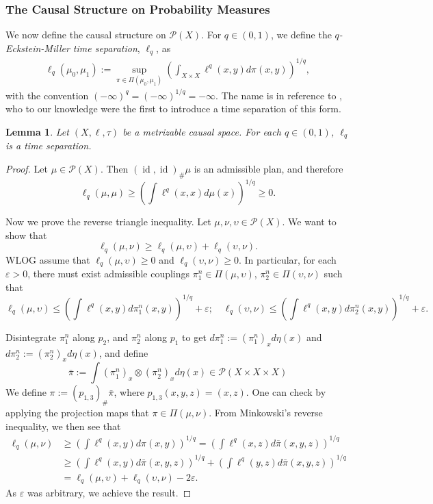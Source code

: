 \documentclass{article}
\renewcommand{\epsilon}{\varepsilon}
\newcommand{\Pcal}{\mathcal{P}}
\DeclareMathOperator{\id}{id}
\newtheorem{lemma}[theorem]{Lemma}
\theoremstyle{definition}
\begin{document}
{\subsubsection{The Causal Structure on Probability Measures}
We now define the causal structure on $\Pcal(X)$. For $q\in(0,1)$, we define the {\it $q$-Eckstein-Miller time separation}, $\ell_q$, as 
\begin{align}\label{l_qdefn}
\ell_q(\mu_0,\mu_1):= \sup_{\pi\in \Pi(\mu_0,\mu_1)} \left(\int_{X\times X} \ell^q(x,y)d\pi(x,y)\right)^{1/q},
\end{align}
with the convention $(-\infty)^q=(-\infty)^{1/q}= -\infty$. The name is in reference to \cite[Def.\ 3]{EcksteinMiller}, who to our knowledge were the first to introduce a time separation of this form. 
\begin{lemma}
Let $(X,\ell,\tau)$ be a metrizable causal space. For each $q\in (0, 1)$, $\ell_q$ is a time separation.
\end{lemma}
\begin{proof}
Let $\mu\in \Pcal(X)$. Then $(\id,\id)_\#\mu$ is an admissible plan, and therefore 
\[\ell_q(\mu,\mu)\geq \left(\int \ell^q(x,x)d\mu(x)\right)^{1/q}\geq 0.\]

Now we prove the reverse triangle inequality. Let $\mu, \nu, \upsilon\in \Pcal(X)$. We want to show that 
\[\ell_q(\mu,\nu)\geq \ell_q(\mu, \upsilon)+\ell_q(\upsilon, \nu). \]
WLOG assume that $\ell_q(\mu,\upsilon)\geq 0$ and $\ell_q(\upsilon, \nu)\geq 0$. In particular, for each $\epsilon>0$, there must exist admissible couplings $\pi_1^n\in \Pi(\mu,\upsilon)$, $\pi_2^n\in \Pi(\upsilon, \nu)$ such that 
\[\ell_q(\mu, \upsilon)\leq \left(\int \ell^q(x,y)d\pi_1^n(x,y)\right)^{1/q}+\epsilon; \quad \ell_q(\upsilon, \nu) \leq \left(\int\ell^q(x,y)d\pi_2^n(x,y)\right)^{1/q}+\epsilon.\]

Disintegrate $\pi_1^n$ along $p_2$, and $\pi_2^n$ along $p_1$ to get $d\pi_1^n:=  (\pi_1^n)_x d\eta(x)$ and $d\pi_2^n :=  (\pi_2^n)_x d\eta(x)$, and define 
\[\bar \pi:= \int (\pi_1^n)_x\otimes (\pi_2^n)_x d\eta(x) \in \Pcal(X\times X\times X)\]
We define $\pi:= (p_{1,3})_\# \bar \pi$, where $p_{1,3}(x,y,z)= (x,z)$. One can check by applying the projection maps that $\pi\in \Pi(\mu, \nu)$. From Minkowski's reverse inequality, we then see that 
\begin{align*}
\ell_q(\mu, \nu) &\geq \left(\int \ell^q(x,y) d\pi(x,y)\right)^{1/q} = \left(\int \ell^q(x,z) d\bar \pi(x,y,z)\right)^{1/q}\\
&\geq \left(\int \ell^q(x,y) d\bar \pi(x,y,z)\right)^{1/q}+\left(\int \ell^q(y,z)d\bar \pi(x,y,z)\right)^{1/q}\\
&= \ell_q(\mu, \upsilon)+\ell_q(\upsilon,\nu)-2\epsilon.
\end{align*}
As $\epsilon$ was arbitrary, we achieve the result. 
\end{proof}

}
\end{document}

